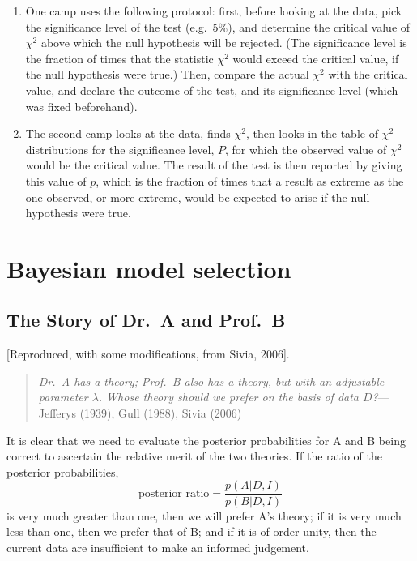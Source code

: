 \documentclass[%
oneside,                 %
final,                   %
10pt]{article}
\begin{document}
\begin{enumerate}
\item One camp uses the following protocol: first, before looking at the data, pick the significance level of the test (e.g.~5\%), and determine the critical value of $\chi^2$ above which the null hypothesis will be rejected. (The significance level is the fraction of times that the statistic $\chi^2$ would exceed the critical value, if the null hypothesis were true.) Then, compare the actual $\chi^2$ with the critical value, and declare the outcome of the test, and its significance level (which was fixed beforehand).

\item The second camp looks at the data, finds $\chi^2$, then looks in the table of $\chi^2$-distributions for the significance level, $P$, for which the observed value of $\chi^2$ would be the critical value. The result of the test is then reported by giving this value of $p$, which is the fraction of times that a result as extreme as the one observed, or more extreme, would be expected to arise if the null hypothesis were true. 
\end{enumerate}

\noindent
\section{Bayesian model selection}
\subsection{The Story of Dr.~A and Prof.~B}
[Reproduced, with some modifications, from Sivia, 2006].

\begin{quote}
\emph{Dr.~A has a theory; Prof.~B also has a theory, but with an adjustable parameter $\lambda$. Whose theory should we prefer on the basis of data $D$?}--- Jefferys (1939), Gull (1988), Sivia (2006)
\end{quote}

It is clear that we need to evaluate the posterior probabilities for A and B being correct to ascertain the relative merit of the two theories. If the ratio of the posterior probabilities,
\begin{equation}
\text{posterior ratio} = \frac{p(A |D, I )}{p(B|D,I)}
\label{eq:sivia_41}
\end{equation}
is very much greater than one, then we will prefer A’s theory; if it is very much less than one, then we prefer that of B; and if it is of order unity, then the current data are insufficient to make an informed judgement.
\end{document}
